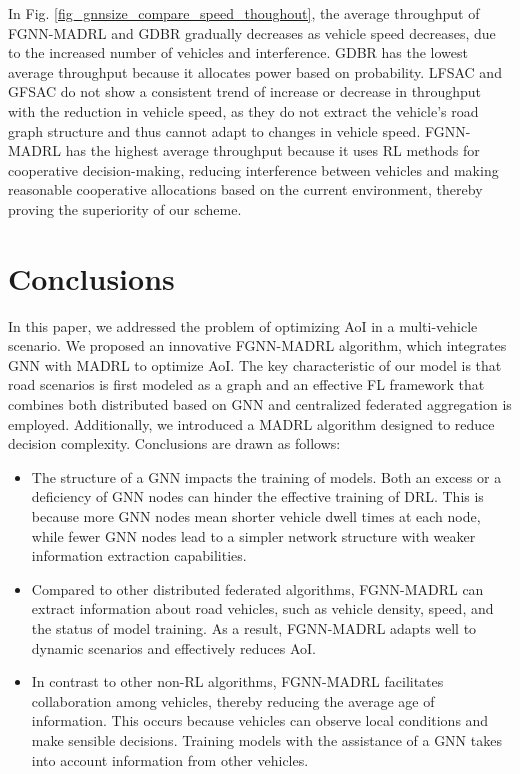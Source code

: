\documentclass[lettersize,journal,onecolumn]{IEEEtran}
\begin{document}
In Fig. \ref{fig_gnnsize_compare_speed_thoughout}, the average throughput of FGNN-MADRL and GDBR gradually decreases as vehicle speed decreases, due to the increased number of vehicles and interference. GDBR has the lowest average throughput because it allocates power based on probability. LFSAC and GFSAC do not show a consistent trend of increase or decrease in throughput with the reduction in vehicle speed, as they do not extract the vehicle's road graph structure and thus cannot adapt to changes in vehicle speed. FGNN-MADRL has the highest average throughput because it uses RL methods for cooperative decision-making, reducing interference between vehicles and making reasonable cooperative allocations based on the current environment, thereby proving the superiority of our scheme.
\section{Conclusions}
In this paper, we addressed the problem of optimizing AoI in a multi-vehicle scenario. We proposed an innovative FGNN-MADRL algorithm, which integrates GNN with MADRL to optimize AoI. The key characteristic of our model is that road scenarios is first modeled as a graph and an effective FL framework that combines both distributed based on GNN and centralized federated aggregation is employed. Additionally, we introduced a MADRL algorithm designed to reduce decision complexity. Conclusions are drawn as follows: 
\begin{itemize}
\item{The structure of a GNN impacts the training of models. Both an excess or a deficiency of GNN nodes can hinder the effective training of DRL. This is because more GNN nodes mean shorter vehicle dwell times at each node, while fewer GNN nodes lead to a simpler network structure with weaker information extraction capabilities.}
\item{Compared to other distributed federated algorithms, FGNN-MADRL can extract information about road vehicles, such as vehicle density, speed, and the status of model training. As a result, FGNN-MADRL adapts well to dynamic scenarios and effectively reduces AoI.}
\item{In contrast to other non-RL algorithms, FGNN-MADRL facilitates collaboration among vehicles, thereby reducing the average age of information. This occurs because vehicles can observe local conditions and make sensible decisions. Training models with the assistance of a GNN takes into account information from other vehicles.}
\end{itemize}



\end{document}
